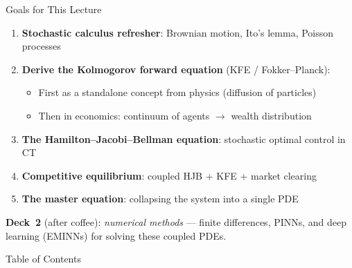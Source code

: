 \documentclass[aspectratio=169,11pt]{beamer}
\newcommand{\emphc}[1]{\textcolor{harvardcrimson}{#1}}
\begin{document}
\begin{frame}{Goals for This Lecture}
\begin{enumerate}\itemsep3pt
    \item \textbf{Stochastic calculus refresher}: Brownian motion, Ito's lemma, Poisson processes
    \item \textbf{Derive the Kolmogorov forward equation} (KFE / Fokker--Planck):
    \begin{itemize}
        \item First as a \emphc{standalone concept from physics} (diffusion of particles)
        \item Then in \emphc{economics}: continuum of agents $\to$ wealth distribution
    \end{itemize}
    \item \textbf{The Hamilton--Jacobi--Bellman equation}: stochastic optimal control in CT
    \item \textbf{Competitive equilibrium}: coupled HJB + KFE + market clearing
    \item \textbf{The master equation}: collapsing the system into a single PDE
\end{enumerate}

\vspace{0.3em}
\begin{center}
\colorbox{uzhgreylight}{\parbox{0.8\textwidth}{\centering\small
\textbf{Deck~2} (after coffee): \emph{numerical methods} --- finite differences, PINNs, and deep learning (EMINNs) for solving these coupled PDEs.}}
\end{center}
\end{frame}

\begin{frame}{Table of Contents}
\tableofcontents[hideallsubsections]
\end{frame}
\end{document}

